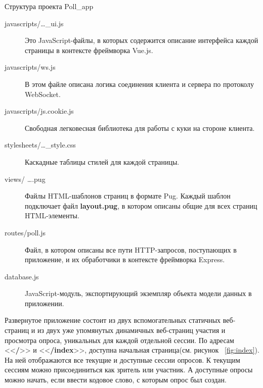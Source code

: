 \begin{ListingEnv}[p]
\caption{Структура проекта Poll\_app}
\label{list:poll-dir}
\end{ListingEnv}
\begin{description}
	\item[javascripts/\dots\_ui.js] Это JavaScript-файлы, в которых содержится описание интерфейса каждой страницы в контексте фреймворка Vue.js. 
	\item[javascripts/ws.js] В этом файле описана логика соединения клиента и сервера по протоколу WebSocket.
	\item[javascripts/js.cookie.js] Свободная легковесная библиотека для работы с куки на стороне клиента.
	\item[stylesheets/\dots\_style.css] Каскадные таблицы стилей для каждой страницы.
	\item[views/ \dots\space.pug] Файлы HTML-шаблонов страниц в формате Pug. Каждый шаблон подключает файл \textbf{layout.pug}, в котором описаны общие для всех страниц HTML-элементы. 
	\item[routes/poll.js] Файл, в котором описаны все пути HTTP-запросов, поступающих в приложение, и их обработчики в контексте фреймворка Express.
	\item[database.js] JavaScript-модуль, экспортирующий экземпляр объекта модели данных в приложении.  
\end{description}

Развернутое приложение состоит из двух вспомогательных статичных веб-страниц и из двух уже упомянутых динамичных веб-страниц участия и просмотра опроса, уникальных для каждой отдельной сессии.  По адресам <<\textbf{/}>> и <<\textbf{/index}>>, доступна начальная страница(см. рисунок ~\ref{fig:index}). На ней отображаются все текущие и доступные сессии опросов. К текущим сессиям можно присоединиться как зритель или участник. А доступные опросы можно начать, если ввести кодовое слово, с которым опрос был создан.

